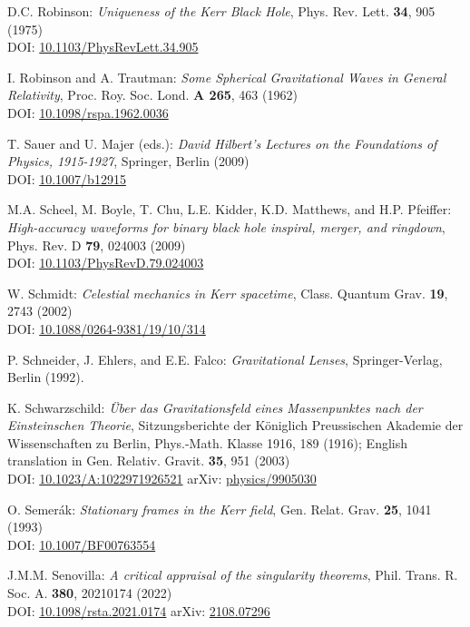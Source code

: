 \begin{thebibliography}{123}
D.C. Robinson: {\em Uniqueness of the Kerr Black Hole},
Phys. Rev. Lett. {\bf 34}, 905 (1975)\\
DOI: \href{https://doi.org/10.1103/PhysRevLett.34.905}{10.1103/PhysRevLett.34.905}

I. Robinson and A. Trautman: {\em Some Spherical Gravitational Waves in General Relativity},
Proc. Roy. Soc. Lond. {\bf A 265}, 463 (1962)\\
DOI: \href{https://doi.org/10.1098/rspa.1962.0036}{10.1098/rspa.1962.0036}

T. Sauer and U. Majer (eds.):
{\em David Hilbert’s Lectures on the Foundations of Physics, 1915-1927},
Springer, Berlin (2009)\\
DOI: \href{https://doi.org/10.1007/b12915}{10.1007/b12915}

M.A. Scheel, M. Boyle, T. Chu, L.E. Kidder, K.D. Matthews, and H.P. Pfeiffer:
{\em High-accuracy waveforms for binary black hole inspiral, merger, and ringdown},
Phys. Rev. D {\bf 79}, 024003 (2009)\\
DOI: \href{https://doi.org/10.1103/PhysRevD.79.024003}{10.1103/PhysRevD.79.024003}

W. Schmidt:
{\em Celestial mechanics in Kerr spacetime},
Class. Quantum Grav. {\bf 19}, 2743 (2002)\\
DOI: \href{https://doi.org/10.1088/0264-9381/19/10/314}{10.1088/0264-9381/19/10/314}

P. Schneider, J. Ehlers, and E.E. Falco:
{\em Gravitational Lenses},
Springer-Verlag, Berlin (1992).

K. Schwarzschild:
{\em \"Uber das Gravitationsfeld eines Massenpunktes nach der Einsteinschen Theorie},
Sitzungsberichte der K\"oniglich Preussischen Akademie der Wissenschaften zu Berlin, Phys.-Math. Klasse 1916, 189 (1916);
English translation in Gen. Relativ. Gravit. {\bf 35}, 951 (2003)\\
DOI: \href{https://doi.org/10.1023/A:1022971926521}{10.1023/A:1022971926521}\hfill
arXiv: \href{https://arxiv.org/abs/physics/9905030}{physics/9905030}

O. Semer\'ak:
{\em Stationary frames in the Kerr field},
Gen. Relat. Grav. {\bf 25}, 1041 (1993)\\
DOI: \href{https://doi.org/10.1007/BF00763554}{10.1007/BF00763554}

J.M.M. Senovilla:
{\em A critical appraisal of the singularity theorems},
Phil. Trans. R. Soc. A. {\bf 380}, 20210174 (2022)\\
DOI: \href{https://doi.org/10.1098/rsta.2021.0174}{10.1098/rsta.2021.0174}\hfill
arXiv: \href{https://arxiv.org/abs/2108.07296}{2108.07296}


\end{thebibliography}
